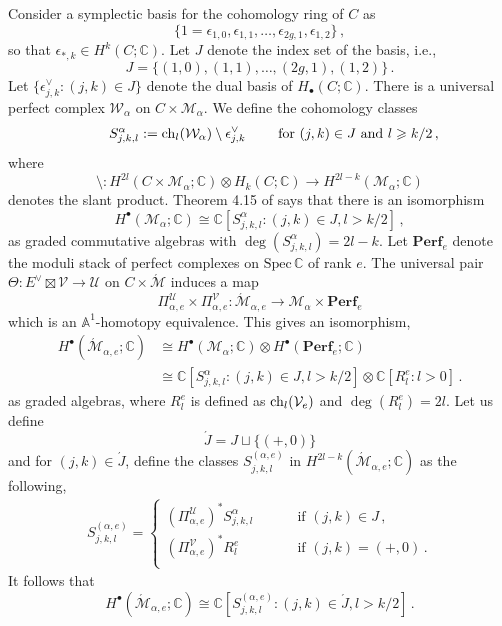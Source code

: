 \documentclass[11pt]{amsart}
\theoremstyle{remark}
\newcommand{\e}{\epsilon}
\newcommand{\C}{\mathbb{C}}
\newcommand{\ch}{{\rm ch}}
\newcommand{\mb}[1]{\mathbb{#1}}
\newcommand{\M}{\mathcal{M}}
\newcommand{\Mdash}{\acute{\mathcal{M}}}
\newcommand{\spec}{\text{Spec}}
\newcommand{\U}{\mathcal{U}}
\newcommand{\W}{\mathcal{W}}
\newcommand{\V}{\mathcal{V}}
\newcommand{\perf}[0]{\textbf{Perf}}
\numberwithin{theorem}{section}
\begin{document}
Consider a symplectic basis for the cohomology ring of $C$ as 
$$\{1=\e_{1,0}, \e_{1,1}, \dots,\e_{2g,1},\e_{1,2}\}\, ,$$
so that $\e_{*,k} \in H^k(C;\mb C)$.
Let $J$ denote the index set of the basis, i.e.,
$$J = \{(1,0),(1,1),\dots,(2g,1),(1,2)\}\,.$$
Let $\{\e^\vee_{j,k} : (j,k)\in J\}$ denote the dual basis of $H_\bullet(C;\mb C)$.
There is a universal perfect complex $\W_\alpha$ on $C \times \M_\alpha$.
We define the cohomology classes
\begin{align}\label{equation definition S_j,k,l classes}
\qquad S^\alpha_{j,k,l} := \ch_l(\W_\alpha) \setminus \e^\vee_{j,k} 
 \qquad \text{ for }(j,k)\in J \text{ and } l \geqslant k/2\,, 
\end{align}
where 
$$\setminus : H^{2l}(C \times \M_\alpha;\mb C) \otimes H_k(C;\mb C) \to H^{2l-k}(\M_\alpha;\mb C) $$
denotes the slant product.
Theorem 4.15 of \cite{gros20} says that there is an isomorphism
$$H^\bullet(\M_\alpha;\mb C) \cong \mb C[S^\alpha_{j,k,l}: (j,k)\in J, l>k/2]\,,$$
as graded commutative algebras with $\deg(S^\alpha_{j,k,l}) = 2l-k$.
Let $\perf_e$ denote the moduli stack of perfect complexes on $\spec \, \C$ of rank $e$.
The universal pair $\Theta: E^\vee \boxtimes \V \to \U$ on $C \times \Mdash$ induces a map
$$ \Pi_{\alpha,e}^\U \times \Pi_{\alpha,e}^\V : \Mdash_{\alpha,e} \to \M_\alpha \times \perf_e$$
which is an $\mb A^1$-homotopy equivalence.
This gives an isomorphism, 
\begin{align*}
H^\bullet(\Mdash_{\alpha,e};\mb C) & \cong H^\bullet(\M_\alpha;\mb C) \otimes H^\bullet(\perf_e;\mb C)\\ 
& \cong \mb C[S^\alpha_{j,k,l}: (j,k)\in J, l>k/2] \otimes \mb C[R^e_{l} : l>0]\,.
\end{align*}
as graded algebras, where $R^e_l$ is defined as $\ch_l(\V_e)$ and $\deg(R^e_l) = 2l$.
Let us define $$\acute J = J \sqcup \{(+,0)\}$$ and
for $(j,k)\in \acute J$, define the classes $S^{(\alpha,e)}_{j,k,l}$
in $H^{2l-k}(\Mdash_{\alpha,e};\mb C)$
as the following,
\begin{align*}
    S^{(\alpha,e)}_{j,k,l} = 
    \begin{cases}
        (\Pi_{\alpha,e}^\U)^*S^{\alpha}_{j,k,l} \qquad &\text{ if }(j,k) \in J\,,\\
        (\Pi_{\alpha,e}^\V)^*R^e_l &\text{ if }(j,k) = (+,0)\,.\\
    \end{cases}
\end{align*}
It follows that 
$$H^\bullet(\Mdash_{\alpha,e};\mb C) \cong \mb C[S^{(\alpha,e)}_{j,k,l}: (j,k)\in \acute J, l>k/2]\,.$$
\end{document}
